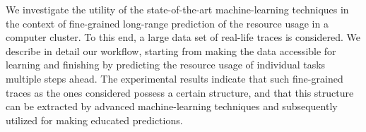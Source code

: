 We investigate the utility of the state-of-the-art machine-learning techniques
in the context of fine-grained long-range prediction of the resource usage in a
computer cluster. To this end, a large data set of real-life traces is
considered. We describe in detail our workflow, starting from making the data
accessible for learning and finishing by predicting the resource usage of
individual tasks multiple steps ahead. The experimental results indicate that
such fine-grained traces as the ones considered possess a certain structure, and
that this structure can be extracted by advanced machine-learning techniques and
subsequently utilized for making educated predictions.
